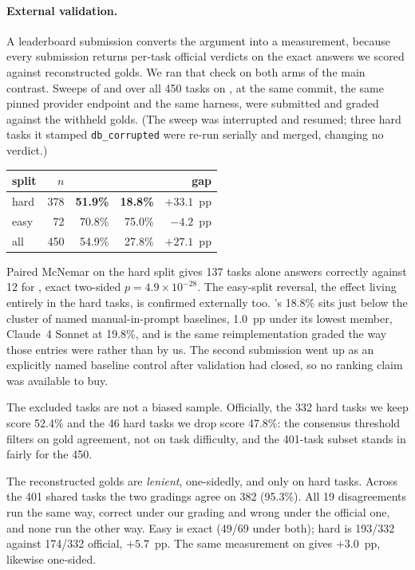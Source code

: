 \paragraph{External validation.} A leaderboard submission converts the
argument into a measurement, because every submission returns per-task
official verdicts on the exact answers we scored against reconstructed
golds. We ran that check on both arms of the main contrast. Sweeps of
\armC{} and \armM{} over all 450 tasks on \mGLM{}, at the same commit, the
same pinned provider endpoint and the same harness, were submitted and
graded against the withheld golds. (The \armM{} sweep was interrupted and
resumed; three hard tasks it stamped \texttt{db\_corrupted} were re-run
serially and merged, changing no verdict.)

\begin{center}
\small
\begin{tabular}{@{}lrrrr@{}}
\toprule
split & $n$ & \armC{} & \armM{} & gap \\
\midrule
hard & 378 & \textbf{51.9\%} & \textbf{18.8\%} & $+33.1$~pp \\
easy & 72  & 70.8\% & 75.0\% & $-4.2$~pp \\
all  & 450 & 54.9\% & 27.8\% & $+27.1$~pp \\
\bottomrule
\end{tabular}
\end{center}

\noindent Paired McNemar on the hard split gives 137 tasks \armC{} alone
answers correctly against 12 for \armM{}, exact two-sided
$p{=}4.9\times10^{-28}$. The easy-split reversal, the effect living entirely
in the hard tasks, is confirmed externally too. \armM{}'s 18.8\% sits just
below the cluster of named manual-in-prompt baselines, 1.0~pp under its
lowest member, Claude~4 Sonnet at 19.8\%, and is the same reimplementation
graded the way those entries were rather than by us. The second submission
went up as an explicitly named baseline control after validation had closed,
so no ranking claim was available to buy.

The excluded tasks are not a biased sample. Officially, the 332 hard tasks
we keep score 52.4\% and the 46 hard tasks we drop score 47.8\%: the
consensus threshold filters on gold agreement, not on task difficulty, and
the 401-task subset stands in fairly for the 450.

The reconstructed golds are \emph{lenient}, one-sidedly, and only on hard
tasks. Across the 401 shared tasks the two gradings agree on 382 (95.3\%).
All 19 disagreements run the same way, correct under our grading and wrong
under the official one, and none run the other way. Easy is exact (49/69
under both); hard is 193/332 against 174/332 official, $+5.7$~pp. The same
measurement on \armM{} gives $+3.0$~pp, likewise one-sided.

